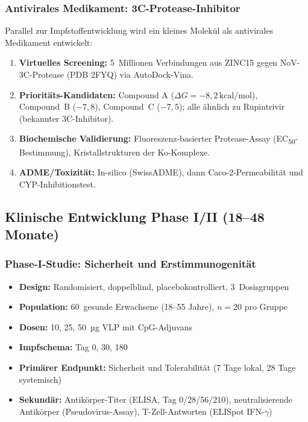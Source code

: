﻿\documentclass[a4paper,12pt]{article}
\theoremstyle{plain}
\theoremstyle{definition}
\theoremstyle{remark}
\begin{document}
\subsubsection{Antivirales Medikament: 3C-Protease-Inhibitor}

Parallel zur Impfstoffentwicklung wird ein kleines Molekül als antivirales
Medikament entwickelt:

\begin{enumerate}
  \item \textbf{Virtuelles Screening:} 5~Millionen Verbindungen aus ZINC15 gegen
        NoV-3C-Protease (PDB 2FYQ) via AutoDock-Vina.
  \item \textbf{Prioritäts-Kandidaten:} Compound A ($\Delta G=-8{,}2\,\text{kcal/mol}$),
        Compound~B ($-7{,}8$), Compound~C ($-7{,}5$); alle ähnlich zu Rupintrivir
        (bekannter 3C-Inhibitor).
  \item \textbf{Biochemische Validierung:} Fluoreszenz-basierter Protease-Assay
        (EC\textsubscript{50}-Bestimmung), Kristallstrukturen der Ko-Komplexe.
  \item \textbf{ADME/Toxizität:} In-silico (SwissADME), dann Caco-2-Permeabilität
        und CYP-Inhibitionstest.
\end{enumerate}

\subsection{Klinische Entwicklung Phase I/II (18--48 Monate)}

\subsubsection{Phase-I-Studie: Sicherheit und Erstimmunogenität}

\begin{itemize}
  \item \textbf{Design:} Randomisiert, doppelblind, placebokontrolliert, 3~Dosisgruppen
  \item \textbf{Population:} 60~gesunde Erwachsene (18--55 Jahre), $n=20$ pro Gruppe
  \item \textbf{Dosen:} 10, 25, 50\, µg VLP mit CpG-Adjuvans
  \item \textbf{Impfschema:} Tag 0, 30, 180
  \item \textbf{Primärer Endpunkt:} Sicherheit und Tolerabilität (7 Tage lokal,
        28 Tage systemisch)
  \item \textbf{Sekundär:} Antikörper-Titer (ELISA, Tag 0/28/56/210),
        neutralisierende Antikörper (Pseudovirus-Assay),
        T-Zell-Antworten (ELISpot IFN-$\gamma$)
\end{itemize}
\end{document}

